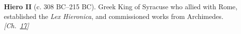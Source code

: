 \textbf{Hiero II} (c. 308 BC–215 BC). Greek King of Syracuse who allied with Rome, established the \emph{Lex Hieronica}, and commissioned works from Archimedes. \emph{[Ch.~\hyperref[ch:bignumbers]{17}]}

